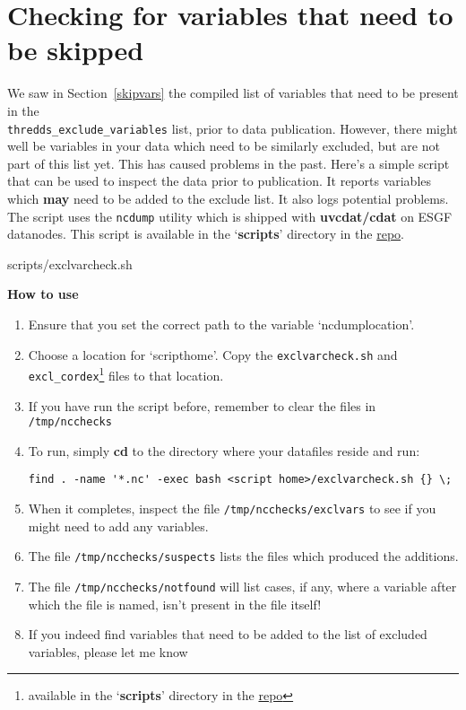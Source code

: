 \section{Checking for variables that need to be skipped}
We saw in Section~\ref{skipvars} the compiled list of variables that need to be present in the \\
\texttt{thredds\_exclude\_variables} list, prior to data publication. However, there might well be variables in your data which need to be similarly excluded, but are not part of this list yet. This has caused problems in the past.  Here's a simple script that can be used to inspect the data prior to publication.  It reports variables which \textbf{may} need to be added to the exclude list. It also logs potential problems. The script uses the \texttt{ncdump} utility which is shipped with \textbf{uvcdat/cdat} on ESGF datanodes. This script is available in the `\textbf{scripts}' directory in the \href{https://github.com/snic-nsc/datanode-mgr-doc.git}{repo}.
\begin{tiny} 
\begin{verbatimtabinput}[4]{scripts/exclvarcheck.sh}
\end{verbatimtabinput}
\end{tiny}
\textbf{How to use}
\begin{enumerate}
\item Ensure that you set the correct path to the variable `ncdumplocation'.
\item Choose a location for `scripthome'. Copy the \texttt{exclvarcheck.sh} and \texttt{excl\_cordex}\footnote{available in the `\textbf{scripts}' directory in the \href{https://github.com/snic-nsc/datanode-mgr-doc.git}{repo}} files to that location. 
\item If you have run the script before, remember to clear the files in \texttt{/tmp/ncchecks}
\item To run, simply \textbf{cd} to the directory where your datafiles reside and run:
\begin{verbatim}
find . -name '*.nc' -exec bash <script home>/exclvarcheck.sh {} \;
\end{verbatim}
\item When it completes, inspect the file \texttt{/tmp/ncchecks/exclvars} to see if you might need to add any variables.
\item The file \texttt{/tmp/ncchecks/suspects} lists the files which produced the additions. 
\item The file \texttt{/tmp/ncchecks/notfound} will list cases, if any, where a variable after which the file is named, isn't present in the file itself!
\item If you indeed find variables that need to be added to the list of excluded variables, please let me know 
\end{enumerate}
